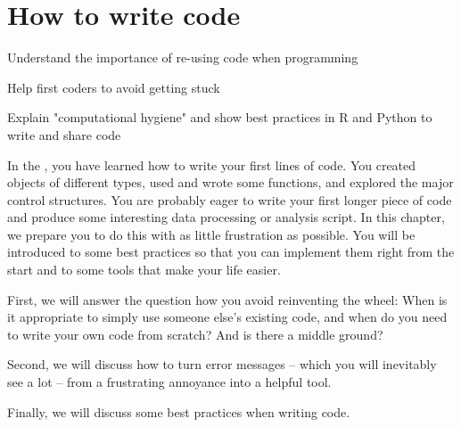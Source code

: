 \chapter{How to write code}
\label{chap:worldcode}

\begin{abstract}{Abstract}
  
Programming is no longer a solitary activity, and almost all questions, problems, and error messages have been encountered and solved before. This chapter explains the most common forms of collaboration and sources of outside help, as well as giving best practices on how to write and share code yourself.
\end{abstract}


\begin{objectives}
\item Understand the importance of re-using code when programming
\item Help first coders to avoid getting stuck
\item Explain "computational hygiene" and show best practices in R and Python to write and share code
\end{objectives}

In the , you have learned how to write
your first lines of code.  You created objects of different types,
used and wrote some functions, and explored the major control structures.
You are probably eager to write your first longer piece of code and
produce some interesting data processing or analysis script. In this
chapter, we prepare you to do this with as little frustration as possible.
You will be introduced to some best practices so that you can implement
them right from the start and to some tools that make your life easier.

First, we will answer the question how you avoid reinventing
the wheel: When is it appropriate to simply use someone else's existing code, and
when do you need to write your own code from scratch? And is there a middle ground?

Second, we will discuss how to turn error messages -- which you will inevitably
see a lot -- from a frustrating annoyance into a helpful tool.

Finally, we will discuss some best practices when writing code.






